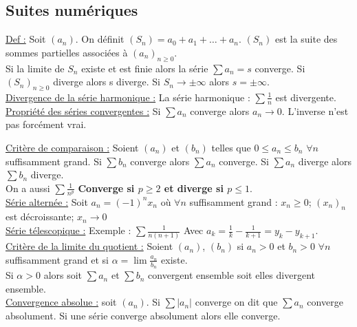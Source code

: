 \documentclass[../main.tex]{subfiles}
\begin{document}
\subsection{Suites numériques}
\underline{Def :} Soit $(a_n)$. On définit $(S_n) = a_0 + a_1 + \dots + a_n$. $(S_n)$ est la suite des sommes partielles associées à $(a_n)_{n\geq 0}$.\\
Si la limite de $S_n$ existe et est finie alors la série $\sum a_n = s$ converge. Si $(S_n)_{n\geq 0}$ diverge alors s diverge. Si $S_n \rightarrow \pm \infty$ alors $s = \pm \infty$.\\

\quad \underline{Divergence de la série harmonique :} La série harmonique : $\sum \frac{1}{n}$ est divergente.\\

\underline{Propriété des séries convergentes :} Si $\sum a_n$ converge alors $a_n \rightarrow 0$. L'inverse n'est pas forcément vrai.

\quad \underline{Critère de comparaison :} Soient $(a_n)$ et $(b_n)$ telles que $0 \leq a_n \leq b_n$ $\forall n$ suffisamment grand. Si $\sum b_n$ converge alors $\sum a_n$ converge. Si $\sum a_n$ diverge alors $\sum b_n$ diverge.\\

On a aussi $\sum \frac{1}{n^p}$ \textbf{Converge si $p\geq 2$ et diverge si $p \leq 1$}.\\

\quad \underline{Série alternée :} Soit $a_n = (-1)^nx_n$ où $\forall n$ suffisamment grand : $x_n \geq 0$; $(x_n)_n$ est décroissante; $x_n \rightarrow 0$\\

\quad \underline{Série télescopique :} Exemple : $\sum \frac{1}{n(n+1)}$ Avec $a_k = \frac{1}{k} - \frac{1}{k+1} = y_k - y_{k+1}$.\\

\quad \underline{Critère de la limite du quotient :} Soient $(a_n)$, $(b_n)$ si $a_n > 0$ et $b_n>0$ $\forall n$ suffisamment grand et si $\alpha = \lim \frac{a_n}{b_n}$ existe.\\
Si $\alpha > 0$
 alors soit $\sum a_n$ et $\sum b_n$ convergent ensemble soit elles divergent ensemble.\\

 \quad \underline{Convergence absolue :} soit $(a_n)$. Si $\sum |a_n|$ converge on dit que $\sum a_n$ converge absolument. Si une série converge absolument alors elle converge.\\
\end{document}
